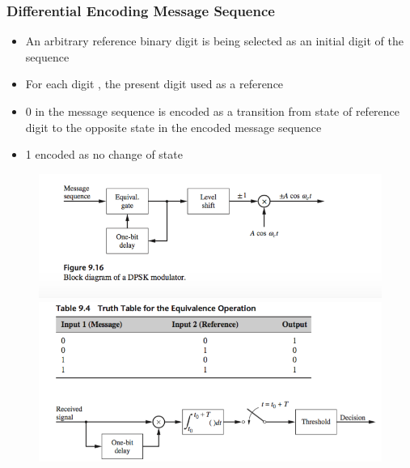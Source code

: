 \documentclass{beamer}
\begin{document}
\begin{frame}
	\frametitle{Differential Encoding Message Sequence}
	\begin{itemize}
		\item An arbitrary reference binary digit is being selected as an initial digit of the sequence
		\item For each digit , the present digit used as a reference
		\item 0 in the message sequence is encoded as  a transition from state of reference digit to the opposite state in the encoded message sequence
		\item 1 encoded as no change of state
	\end{itemize}
	\begin{figure}
		\includegraphics[width=\textwidth]{9_3_1.png} \\
		\includegraphics[width=\textwidth]{9_4_1.png}
	\end{figure}
\end{frame}
\end{document}
